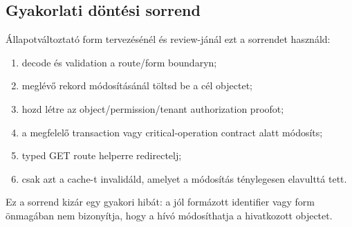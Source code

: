\subsection*{Gyakorlati döntési sorrend}

Állapotváltoztató form tervezésénél és review-jánál ezt a sorrendet használd:

\begin{enumerate}
  \item decode és validation a route/form boundaryn;
  \item meglévő rekord módosításánál töltsd be a cél objectet;
  \item hozd létre az object/permission/tenant authorization proofot;
  \item a megfelelő transaction vagy critical-operation contract alatt módosíts;
  \item typed GET route helperre redirectelj;
  \item csak azt a cache-t invalidáld, amelyet a módosítás ténylegesen elavulttá tett.
\end{enumerate}

Ez a sorrend kizár egy gyakori hibát: a jól formázott identifier vagy form önmagában nem bizonyítja, hogy a hívó módosíthatja a hivatkozott objectet.

